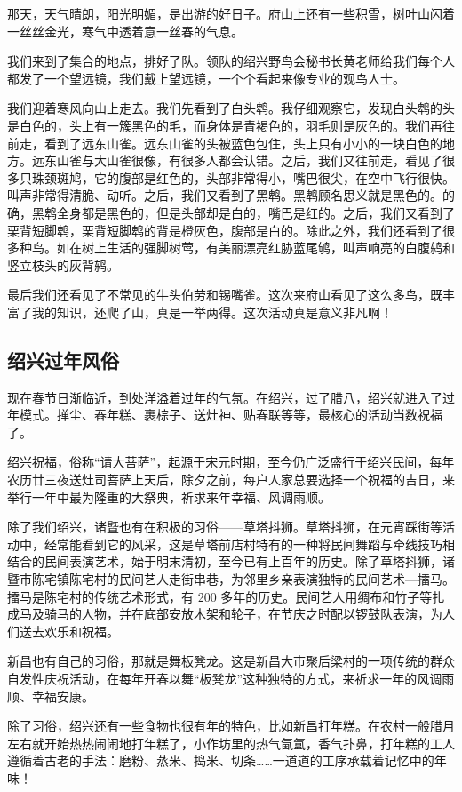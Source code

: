 \documentclass[UTF8,a4paper,titlepage,twoside,10.5pt]{article}
\begin{document}
那天，天气晴朗，阳光明媚，是出游的好日子。府山上还有一些积雪，树叶山闪着一丝丝金光，寒气中透着意一丝春的气息。

我们来到了集合的地点，排好了队。领队的绍兴野鸟会秘书长黄老师给我们每个人都发了一个望远镜，我们戴上望远镜，一个个看起来像专业的观鸟人士。

我们迎着寒风向山上走去。我们先看到了白头鹎。我仔细观察它，发现白头鹎的头是白色的，头上有一簇黑色的毛，而身体是青褐色的，羽毛则是灰色的。我们再往前走，看到了远东山雀。远东山雀的头被蓝色包住，头上只有小小的一块白色的地方。远东山雀与大山雀很像，有很多人都会认错。之后，我们又往前走，看见了很多只珠颈斑鸠，它的腹部是红色的，头部非常得小，嘴巴很尖，在空中飞行很快。叫声非常得清脆、动听。之后，我们又看到了黑鹎。黑鹎顾名思义就是黑色的。的确，黑鹎全身都是黑色的，但是头部却是白的，嘴巴是红的。之后，我们又看到了栗背短脚鹎，栗背短脚鹎的背是橙灰色，腹部是白的。除此之外，我们还看到了很多种鸟。如在树上生活的强脚树莺，有美丽漂亮红胁蓝尾鸲，叫声响亮的白腹鸫和竖立枝头的灰背鸫。

最后我们还看见了不常见的牛头伯劳和锡嘴雀。这次来府山看见了这么多鸟，既丰富了我的知识，还爬了山，真是一举两得。这次活动真是意义非凡啊！

\subsection{绍兴过年风俗}
\label{sec:org43e5f5b}

现在春节日渐临近，到处洋溢着过年的气氛。在绍兴，过了腊八，绍兴就进入了过年模式。掸尘、舂年糕、裹棕子、送灶神、贴春联等等，最核心的活动当数祝福了。

绍兴祝福，俗称“请大菩萨”，起源于宋元时期，至今仍广泛盛行于绍兴民间，每年农历廿三夜送灶司菩萨上天后，除夕之前，每户人家总要选择一个祝福的吉日，来举行一年中最为隆重的大祭典，祈求来年幸福、风调雨顺。

除了我们绍兴，诸暨也有在积极的习俗——草塔抖狮。草塔抖狮，在元宵踩街等活动中，经常能看到它的风采，这是草塔前店村特有的一种将民间舞蹈与牵线技巧相结合的民间表演艺术，始于明末清初，至今已有上百年的历史。除了草塔抖狮，诸暨市陈宅镇陈宅村的民间艺人走街串巷，为邻里乡亲表演独特的民间艺术—擂马。擂马是陈宅村的传统艺术形式，有 200 多年的历史。民间艺人用绸布和竹子等扎成马及骑马的人物，并在底部安放木架和轮子，在节庆之时配以锣鼓队表演，为人们送去欢乐和祝福。

新昌也有自己的习俗，那就是舞板凳龙。这是新昌大市聚后梁村的一项传统的群众自发性庆祝活动，在每年开春以舞“板凳龙”这种独特的方式，来祈求一年的风调雨顺、幸福安康。

除了习俗，绍兴还有一些食物也很有年的特色，比如新昌打年糕。在农村一般腊月左右就开始热热闹闹地打年糕了，小作坊里的热气氤氲，香气扑鼻，打年糕的工人遵循着古老的手法：磨粉、蒸米、捣米、切条……一道道的工序承载着记忆中的年味！
\end{document}
